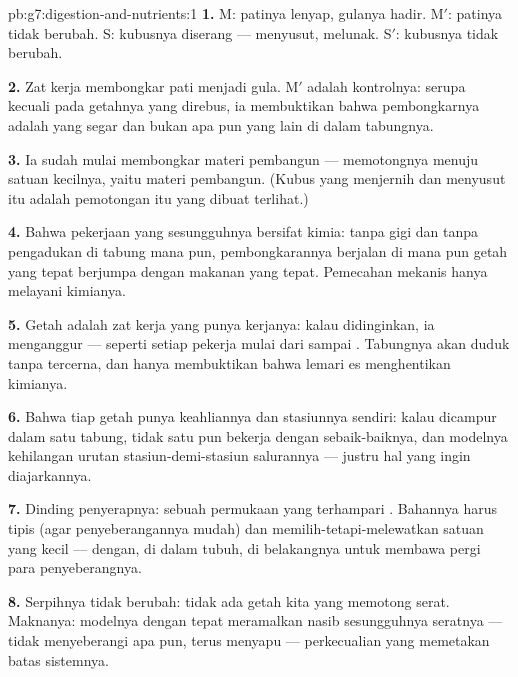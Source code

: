 \begin{solution}{pb:g7:digestion-and-nutrients:1}
\textbf{1.} M: patinya lenyap, gulanya hadir. M$'$: patinya tidak
berubah. S: kubusnya diserang --- menyusut, melunak. S$'$: kubusnya
tidak berubah.

\textbf{2.} Zat kerja  membongkar pati menjadi gula. M$'$
adalah kontrolnya: serupa kecuali pada getahnya yang direbus, ia
membuktikan bahwa pembongkarnya adalah  yang segar dan bukan
apa pun yang lain di dalam tabungnya.

\textbf{3.} Ia sudah mulai membongkar materi pembangun  ---
memotongnya menuju satuan kecilnya, yaitu  materi pembangun.
(Kubus yang menjernih dan menyusut itu adalah pemotongan itu yang
dibuat terlihat.)

\textbf{4.} Bahwa pekerjaan yang sesungguhnya bersifat kimia: tanpa
gigi dan tanpa pengadukan di tabung mana pun, pembongkarannya berjalan
di mana pun getah yang tepat berjumpa dengan makanan yang tepat.
Pemecahan mekanis hanya melayani kimianya.

\textbf{5.} Getah adalah zat kerja yang punya  kerjanya: kalau
didinginkan, ia menganggur --- seperti setiap pekerja mulai dari
 sampai . Tabungnya akan duduk tanpa tercerna, dan hanya
membuktikan bahwa lemari es menghentikan kimianya.

\textbf{6.} Bahwa tiap getah punya keahliannya dan  stasiunnya
sendiri: kalau dicampur dalam satu tabung, tidak satu pun bekerja
dengan sebaik-baiknya, dan modelnya kehilangan urutan
stasiun-demi-stasiun salurannya --- justru hal yang ingin diajarkannya.

\textbf{7.} Dinding penyerapnya: sebuah permukaan yang terhampari
. Bahannya harus tipis (agar penyeberangannya mudah) dan
memilih-tetapi-melewatkan satuan yang kecil --- dengan, di dalam
tubuh,  di belakangnya untuk membawa pergi para
penyeberangnya.

\textbf{8.} Serpihnya tidak berubah: tidak ada getah kita yang
memotong serat. Maknanya: modelnya dengan tepat meramalkan nasib
sesungguhnya seratnya --- tidak menyeberangi apa pun, terus menyapu
--- perkecualian yang memetakan batas sistemnya.


\end{solution}
